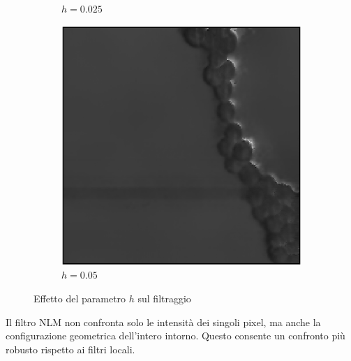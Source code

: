 \documentclass[../main.tex]{subfiles}
\begin{document}
\begin{figure}[ht]
\begin{subfigure}{0.32\linewidth}
		\caption{$h = 0.025$}
	\end{subfigure}
	\begin{subfigure}{0.32\linewidth}
		\includegraphics[keepaspectratio, width=\linewidth]{images/nlm_005.png}
		\caption{$h = 0.05$}
	\end{subfigure}
	\caption{Effetto del parametro $h$ sul filtraggio}
\end{figure}

Il filtro NLM non confronta solo le intensità dei singoli pixel, ma anche la configurazione geometrica dell'intero intorno. Questo consente un confronto più robusto rispetto ai filtri locali.
\end{document}
